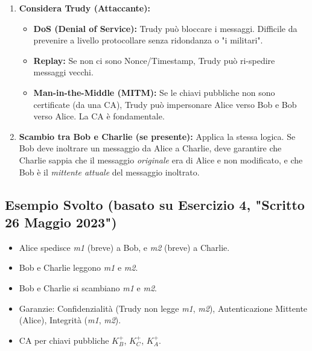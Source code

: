 \begin{enumerate}[label=\arabic*.]
    \item \textbf{Considera Trudy (Attaccante):}
    \begin{itemize}
        \item \textbf{DoS (Denial of Service):} Trudy può bloccare i messaggi. Difficile da prevenire a livello protocollare senza ridondanza o "i militari".
        \item \textbf{Replay:} Se non ci sono Nonce/Timestamp, Trudy può ri-spedire messaggi vecchi.
        \item \textbf{Man-in-the-Middle (MITM):} Se le chiavi pubbliche non sono certificate (da una CA), Trudy può impersonare Alice verso Bob e Bob verso Alice. La CA è fondamentale.
    \end{itemize}
    \item \textbf{Scambio tra Bob e Charlie (se presente):} Applica la stessa logica. Se Bob deve inoltrare un messaggio da Alice a Charlie, deve garantire che Charlie sappia che il messaggio \textit{originale} era di Alice e non modificato, e che Bob è il \textit{mittente attuale} del messaggio inoltrato.
\end{enumerate}

\subsection{Esempio Svolto (basato su Esercizio 4, "Scritto 26 Maggio 2023")}
\begin{itemize}
    \item Alice spedisce \textit{m1} (breve) a Bob, e \textit{m2} (breve) a Charlie.
    \item Bob e Charlie leggono \textit{m1} e \textit{m2}.
    \item Bob e Charlie si scambiano \textit{m1} e \textit{m2}.
    \item Garanzie: Confidenzialità (Trudy non legge \textit{m1}, \textit{m2}), Autenticazione Mittente (Alice), Integrità (\textit{m1}, \textit{m2}).
    \item CA per chiavi pubbliche $K_B^+$, $K_C^+$, $K_A^+$.
\end{itemize}

